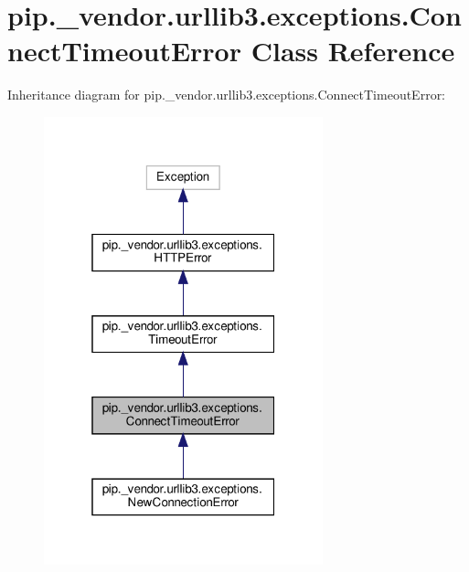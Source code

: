 \hypertarget{classpip_1_1__vendor_1_1urllib3_1_1exceptions_1_1ConnectTimeoutError}{}\section{pip.\+\_\+vendor.\+urllib3.\+exceptions.\+Connect\+Timeout\+Error Class Reference}
\label{classpip_1_1__vendor_1_1urllib3_1_1exceptions_1_1ConnectTimeoutError}


Inheritance diagram for pip.\+\_\+vendor.\+urllib3.\+exceptions.\+Connect\+Timeout\+Error\+:
\nopagebreak
\begin{figure}[H]
\begin{center}
\leavevmode
\includegraphics[width=229pt]{classpip_1_1__vendor_1_1urllib3_1_1exceptions_1_1ConnectTimeoutError__inherit__graph}
\end{center}
\end{figure}


